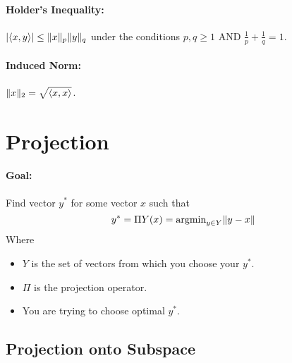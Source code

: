\documentclass[a4paper,12pt]{report}
\DeclarePairedDelimiter\abs{\lvert}{\rvert}%
\DeclarePairedDelimiter\norm{\lVert}{\rVert}%
\DeclarePairedDelimiter\inpr{\langle}{\rangle}%
\begin{document}
\paragraph{Holder's Inequality: } $\abs{\inpr{x, y}} \leq \norm{x}_p \norm{y}_q$ under the conditions $p,q \geq 1$ AND $\frac{1}{p} + \frac{1}{q} = 1$.

\paragraph{Induced Norm: } $\norm{x}_2 = \sqrt{\inpr{x,x}}$.



\section{Projection}

\paragraph{Goal: } Find vector $y^*$ for some vector $x$ such that \begin{equation}
y^* = \Pi Y(x) = \text{argmin}_{y\in Y} \norm{y-x}
\end{equation}
Where 
\begin{itemize}
\item $Y$ is the set of vectors from which you choose your $y^*$.
\item $\Pi$ is the projection operator.
\item You are trying to choose optimal $y^*$.
\end{itemize}

\subsection{Projection onto Subspace}
\end{document}
